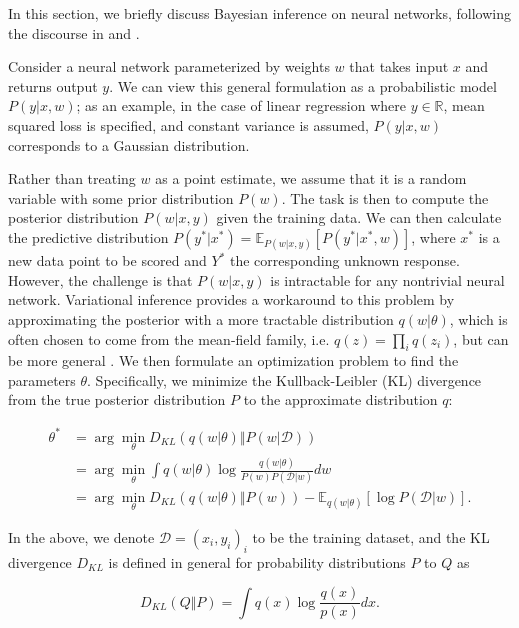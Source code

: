 \documentclass{article}
\begin{document}
In this section, we briefly discuss Bayesian inference on neural networks, following the discourse in \cite{gravesPracticalVariational2011} and \cite{blundellWeightUncertainty2015}.

Consider a neural network parameterized by weights $w$ that takes input $x$ and returns output $y$. We can view this general formulation as a probabilistic model $P(y|x, w)$; as an example, in the case of linear regression where $y \in \mathbb{R}$, mean squared loss is specified, and constant variance is assumed, $P(y|x, w)$ corresponds to a Gaussian distribution.

Rather than treating $w$ as a point estimate, we assume that it is a random variable with some prior distribution $P(w)$. The task is then to compute the posterior distribution $P(w|x, y)$ given the training data. We can then calculate the predictive distribution $P(y^*|x^*) = \mathbb{E}_{P(w|x, y)}[P(y^*|x^*, w)]$, where $x^*$ is a new data point to be scored and $Y^*$ the corresponding unknown response. However, the challenge is that $P(w|x, y)$ is intractable for any nontrivial neural network. Variational inference provides a workaround to this problem by approximating the posterior with a more tractable distribution $q(w|\theta)$, which is often chosen to come from the mean-field family, i.e. $q(z) = \prod_i q(z_i)$, but can be more general \cite{blundellWeightUncertainty2015}. We then formulate an optimization problem to find the parameters $\theta$. Specifically, we minimize the Kullback-Leibler (KL) divergence from the true posterior distribution $P$ to the approximate distribution $q$:

\begin{align}
    \theta^* &= \arg \min_\theta D_{KL}(q(w|\theta) \Vert P(w|\mathcal{D}))\\
             &= \arg \min_\theta \int q(w|\theta) \log \frac{q(w|\theta)}{P(w)P(\mathcal{D}|w)} dw\\
             &= \arg \min_\theta D_{KL}(q(w|\theta) \Vert P(w)) - \mathbb{E}_{q(w|\theta)}[\log P(\mathcal{D}|w)]. \label{eq:1}
\end{align}

In the above, we denote $\mathcal{D} = (x_i, y_i)_i$ to be the training dataset, and the KL divergence $D_{KL}$ is defined in general for probability distributions $P$ to $Q$ as

\begin{equation}
    D_{KL}(Q \Vert P) = \int q(x) \log \frac{q(x)}{p(x)} dx.
\end{equation}
\end{document}
